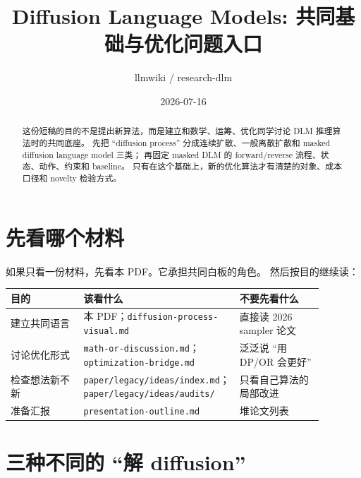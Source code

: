 \documentclass[11pt]{ctexart}
\title{Diffusion Language Models: 共同基础与优化问题入口}
\author{llmwiki / research-dlm}
\date{2026-07-16}
\begin{document}
\maketitle

\begin{abstract}
这份短稿的目的不是提出新算法，而是建立和数学、运筹、优化同学讨论 DLM 推理算法时的共同底座。
先把 ``diffusion process'' 分成连续扩散、一般离散扩散和 masked diffusion language model 三类；
再固定 masked DLM 的 forward/reverse 流程、状态、动作、约束和 baseline。
只有在这个基础上，新的优化算法才有清楚的对象、成本口径和 novelty 检验方式。
\end{abstract}

\section{先看哪个材料}

如果只看一份材料，先看本 PDF。它承担共同白板的角色。
然后按目的继续读：

\begin{center}
\begin{tabular}{p{0.25\linewidth}p{0.35\linewidth}p{0.28\linewidth}}
\toprule
目的 & 该看什么 & 不要先看什么 \\
\midrule
建立共同语言 & 本 PDF；\texttt{diffusion-process-visual.md} & 直接读 2026 sampler 论文 \\
讨论优化形式 & \texttt{math-or-discussion.md}；\texttt{optimization-bridge.md} & 泛泛说 ``用 DP/OR 会更好'' \\
检查想法新不新 & \texttt{paper/legacy/ideas/index.md}；\texttt{paper/legacy/ideas/audits/} & 只看自己算法的局部改进 \\
准备汇报 & \texttt{presentation-outline.md} & 堆论文列表 \\
\bottomrule
\end{tabular}
\end{center}

\section{三种不同的 ``解 diffusion''}
\end{document}
